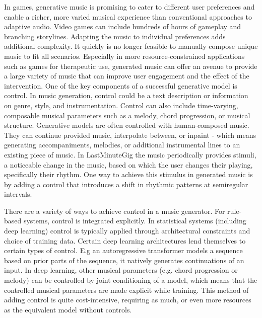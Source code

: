 In games, generative music is promising to cater to different user preferences and enable a richer, more varied musical experience than conventional approaches to adaptive audio. Video games can include hundreds of hours of gameplay and branching storylines. Adapting the music to individual preferences adds additional complexity. It quickly is no longer feasible to manually compose unique music to fit all scenarios. Especially in more resource-constrained applications such as games for therapeutic use, generated music can offer an avenue to provide a large variety of music that can improve user engagement and the effect of the intervention.
One of the key components of a successful generative model is control. In music generation, control could be a text description or information on genre, style, and instrumentation. Control can also include time-varying, composable musical parameters such as a melody, chord progression, or musical structure. Generative models are often controlled with human-composed music. They can continue provided music, interpolate between, or inpaint - which means generating accompaniments, melodies, or additional instrumental lines to an existing piece of music. In LastMinuteGig \cite{Chalkiadakis_2022} the music periodically provides stimuli, a noticeable change in the music, based on which the user changes their playing, specifically their rhythm. One way to achieve this stimulus in generated music is by adding a control that introduces a shift in rhythmic patterns at semiregular intervals. 

There are a variety of ways to achieve control in a music generator. For rule-based systems, control is integrated explicitly. In statistical systems (including deep learning) control is typically applied through architectural constraints and choice of training data. Certain deep learning architectures lend themselves to certain types of control. E.g an autoregressive transformer models a sequence based on prior parts of the sequence, it natively generates continuations of an input. In deep learning, other musical parameters (e.g. chord progression or melody) can be controlled by joint conditioning of a model, which means that the controlled musical parameters are made explicit while training. This method of adding control is quite cost-intensive, requiring as much, or even more resources as the equivalent model without controls. 

